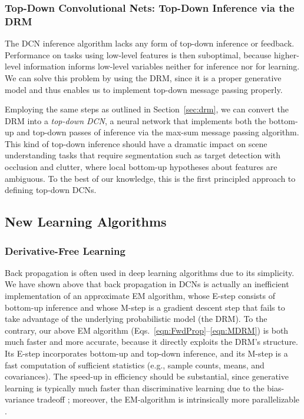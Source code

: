 \documentclass[12pt]{article}
\begin{document}
\subsubsection{Top-Down Convolutional Nets: Top-Down Inference via the DRM} \label{sec:top-down-dcn} 

The DCN inference algorithm lacks any form of top-down inference or feedback. Performance on tasks using low-level features is then suboptimal, because higher-level information informs low-level variables neither for inference nor for learning. We can solve this problem by using the DRM, since it is a proper generative model and thus enables us to implement top-down message passing properly.  

Employing the same steps as outlined in Section~\ref{sec:drm}, we can convert the DRM into a {\em top-down DCN}, a neural network that implements both the bottom-up and top-down passes of inference via the max-sum message passing algorithm. This kind of top-down inference should have a dramatic impact on scene understanding tasks that require segmentation such as target detection with occlusion and clutter, where local bottom-up hypotheses about features are ambiguous. To the best of our knowledge, this is the first principled approach to defining top-down DCNs.

\subsection{New Learning Algorithms}

\subsubsection{Derivative-Free Learning}


Back propagation is often used in deep learning algorithms due to its simplicity. We have shown above that back propagation in DCNs is actually an inefficient implementation of an approximate EM algorithm, whose E-step consists of bottom-up inference and whose M-step is a gradient descent step that fails to take advantage of the underlying probabilistic model (the DRM). 
To the contrary, our above EM algorithm (Eqs.~\ref{eqn:FwdProp}--\ref{eqn:MDRM}) is both much faster and more accurate, because it directly exploits the DRM's structure. Its E-step incorporates bottom-up and top-down inference, and its M-step is a fast computation of sufficient statistics (e.g., sample counts, means, and covariances). The speed-up in efficiency should be substantial, since generative learning is typically much faster than discriminative learning due to the bias-variance tradeoff \cite{jordan2002discriminative}; moreover, the EM-algorithm is intrinsically more parallelizable \cite{kumar2009fast}. 
\end{document}
